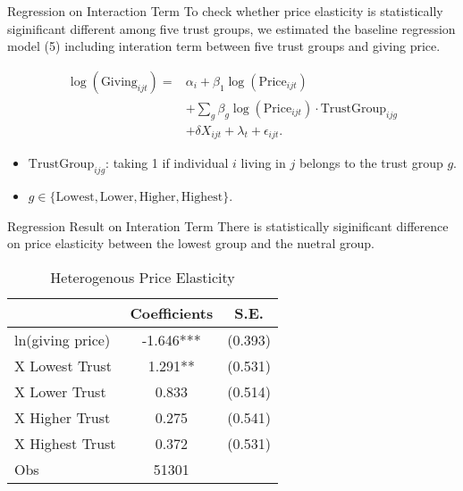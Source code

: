 \documentclass[
  ignorenonframetext,
]{beamer}
\providecommand{\tightlist}{%
  \setlength{\itemsep}{0pt}\setlength{\parskip}{0pt}}
\begin{document}
\begin{frame}{Regression on Interaction Term}
\protect\hypertarget{regression-on-interaction-term}{}
To check whether price elasticity is statistically siginificant
different among five trust groups, we estimated the baseline regression
model (5) including interation term between five trust groups and giving
price.

\begin{align*}
    \log(\text{Giving}_{ijt}) 
    =& \alpha_i + \beta_1 \log(\text{Price}_{ijt}) \\
    &+ \sum_g \beta_g \log(\text{Price}_{ijt}) \cdot \text{TrustGroup}_{ijg}  \\
    &+ \delta X_{ijt} + \lambda_t + \epsilon_{ijt}.
\end{align*}

\begin{itemize}
\tightlist
\item
  \(\text{TrustGroup}_{ijg}\): taking 1 if individual \(i\) living in
  \(j\) belongs to the trust group \(g\).
\item
  \(g \in \{ \text{Lowest}, \text{Lower}, \text{Higher}, \text{Highest} \}\).
\end{itemize}
\end{frame}

\begin{frame}{Regression Result on Interation Term}
\protect\hypertarget{regression-result-on-interation-term}{}
There is statistically siginificant difference on price elasticity
between the lowest group and the nuetral group.

\begin{table}

\caption{\label{tab:kableEstimateInteractionByTrustGroup}Heterogenous Price Elasticity}
\centering
\begin{tabular}[t]{lcc}
\toprule
 & Coefficients & S.E.\\
\midrule
ln(giving price) & -1.646*** & (0.393)\\
X Lowest Trust & 1.291** & (0.531)\\
X Lower Trust & 0.833 & (0.514)\\
X Higher Trust & 0.275 & (0.541)\\
X Highest Trust & 0.372 & (0.531)\\
Obs & 51301 & \\
\bottomrule
\end{tabular}
\end{table}
\end{frame}
\end{document}
